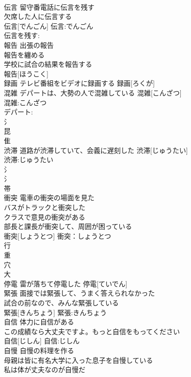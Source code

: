 \documentclass[8pt]{extreport}
\begin{document}
\begin{CJK}{UTF8}{min}
\\	伝言	留守番電話に伝言を残す 
\\	欠席した人に伝言する 
\\	伝言[でんごん]			伝言:でんごん
\\	伝言を残す:
\\	報告	出張の報告 
\\	報告を纏める 
\\	学校に試合の結果を報告する 
\\	報告[ほうこく]						
\\	録画	テレビ番組をビデオに録画する	録画[ろくが]	
\\	混雑	デパートは、大勢の人で混雑している	混雑[こんざつ]	
\\	混雑:こんざつ
\\	デパート:
\\	氵 
\\	昆 
\\	隹 
\\	渋滞	道路が渋滞していて、会義に遅刻した	渋滞[じゅうたい]	
\\	渋滞:じゅうたい
\\	氵 
\\	氵 
\\	帯 
\\	衝突	電車の衝突の場面を見た 
\\	バスがトラックと衝突した 
\\	クラスで意見の衝突がある 
\\	部長と課長が衝突して、周囲が困っている 
\\	衝突[しょうとつ]			衝突：しょうとつ
\\	行 
\\	重 
\\	穴 
\\	大 
\\	停電	雷が落ちて停電した	停電[ていでん]	
\\	緊張	面接では緊張して、うまく答えられなかった 
\\	試合の前なので、みんな緊張している 
\\	緊張[きんちょう]			緊張:きんちょう
\\	自信	体力に自信がある 
\\	この成績なら大丈夫ですよ。もっと自信をもってください 
\\	自信[じしん]			自信:じしん
\\	自慢	自慢の料理を作る 
\\	母親は皆に有名大学に入った息子を自慢している 
\\	私は体が丈夫なのが自慢だ 

\end{CJK}
\end{document}
